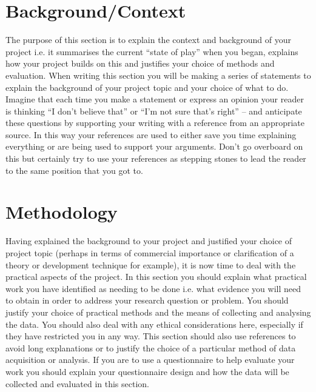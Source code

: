 \documentclass[a4paper, 12pt]{article}
\begin{document}
\section{Background/Context} %
The purpose of this section is to explain the context and background of your project i.e. it summarises the current “state of play” when you began, explains how your project builds on this and justifies your choice of methods and evaluation. When writing this section you will be making a series of statements to explain the background of your project topic and your choice of what to do. Imagine that each time you make a statement or express an opinion your reader is thinking “I don’t believe that” or “I’m not sure that’s right” – and anticipate these questions by supporting your writing with a reference from an appropriate source. In this way your references are used to either save you time explaining everything or are being used to support your arguments. Don’t go overboard on this but certainly try to use your references as stepping stones to lead the reader to the same position that you got to.

\pagebreak


\section{Methodology} %
Having explained the background to your project and justified your choice of project topic (perhaps in terms of commercial importance or clarification of a theory or development technique for example), it is now time to deal with the practical aspects of the project. In this section you should explain what practical work you have identified as needing to be done i.e. what evidence you will need to obtain in order to address your research question or problem. You should justify your choice of practical methods and the means of collecting and analysing the data. You should also deal with any ethical considerations here, especially if they have restricted you in any way. This section should also use references to avoid long explanations or to justify the choice of a particular method of data acquisition or analysis. If you are to use a questionnaire to help evaluate your work you should explain your questionnaire design and how the data will be collected and evaluated in this section.

\pagebreak
\end{document}
